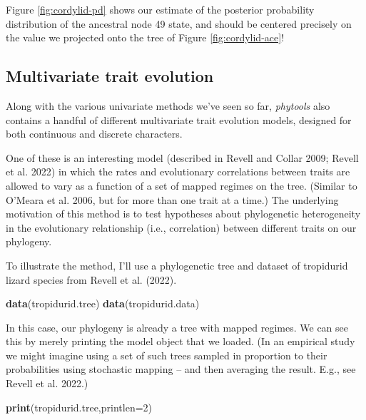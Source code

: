 \documentclass[fleqn,10pt,lineno]{wlpeerj} %
\newenvironment{Shaded}{\begin{snugshade}}{\end{snugshade}}
\newcommand{\AttributeTok}[1]{\textcolor[rgb]{0.13,0.29,0.53}{#1}}
\newcommand{\DecValTok}[1]{\textcolor[rgb]{0.00,0.00,0.81}{#1}}
\newcommand{\FunctionTok}[1]{\textcolor[rgb]{0.13,0.29,0.53}{\textbf{#1}}}
\newcommand{\NormalTok}[1]{#1}
\begin{document}
Figure \ref{fig:cordylid-pd} shows our estimate of the posterior probability distribution of the ancestral node 49 state, and should be centered precisely on the value we projected onto the tree of Figure \ref{fig:cordylid-ace}!

\hypertarget{multivariate-trait-evolution}{%
\subsection{Multivariate trait evolution}\label{multivariate-trait-evolution}}

Along with the various univariate methods we've seen so far, \emph{phytools} also contains a handful of different multivariate trait evolution models, designed for both continuous and discrete characters.

One of these is an interesting model (described in Revell and Collar 2009; Revell et al. 2022) in which the rates and evolutionary correlations between traits are allowed to vary as a function of a set of mapped regimes on the tree. (Similar to O'Meara et al. 2006, but for more than one trait at a time.) The underlying motivation of this method is to test hypotheses about phylogenetic heterogeneity in the evolutionary relationship (i.e., correlation) between different traits on our phylogeny.

To illustrate the method, I'll use a phylogenetic tree and dataset of tropidurid lizard species from Revell et al. (2022).

\begin{Shaded}
\begin{Highlighting}[]
\FunctionTok{data}\NormalTok{(tropidurid.tree)}
\FunctionTok{data}\NormalTok{(tropidurid.data)}
\end{Highlighting}
\end{Shaded}

In this case, our phylogeny is already a tree with mapped regimes. We can see this by merely printing the model object that we loaded. (In an empirical study we might imagine using a set of such trees sampled in proportion to their probabilities using stochastic mapping -- and then averaging the result. E.g., see Revell et al. 2022.)

\begin{Shaded}
\begin{Highlighting}[]
\FunctionTok{print}\NormalTok{(tropidurid.tree,}\AttributeTok{printlen=}\DecValTok{2}\NormalTok{)}
\end{Highlighting}
\end{Shaded}
\end{document}
